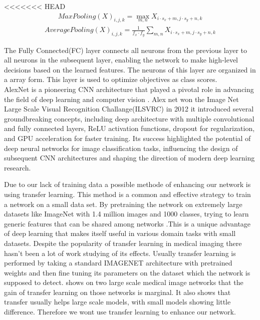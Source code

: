 \documentclass[
a4paper, 
12pt,
grayscalebody, %
abstract=on,
twoside, BCOR10mm, 12pt, DIV13,headinclude, footexclude, final, abstracton, openright
]{ibireprt}
\numberwithin{equation}{chapter}
\numberwithin{table}{chapter}
\numberwithin{figure}{chapter}
\numberwithin{algorithm}{chapter}
\numberwithin{example}{chapter}
\numberwithin{example}{chapter}
\begin{document}
<<<<<<< HEAD
\begin{align}
	MaxPooling(X)_{i,j,k} = \max_{m,n}X_{i\cdot s_x + m, j \cdot s_y+n,k}
\end{align}
\begin{align}
	AveragePooling(X)_{i,j,k} =\frac{1}{f_x\cdot f_y}\sum_{m,n} X_{i\cdot s_x + m, j \cdot s_y+n,k}
\end{align}

The Fully Connected(FC) layer connects all neurons from the previous layer to all neurons in the subsequent layer, enabling the network to make high-level decisions based on the learned features. The neurons of this layer are organized in a array form. This layer is used to optimize objectives as class scores.\\%


AlexNet is a pioneering CNN architecture that played a pivotal role in advancing the field of deep learning and computer vision \cite{Alzubaidi2021}. Alex net won the Image Net Large Scale Visual Recognition Challange(ILSVRC) in 2012 it introduced several groundbreaking concepts, including deep architecture  with multiple convolutional and fully connected layers, ReLU activation functions, dropout for regularization, and GPU acceleration for faster training. Its success highlighted the potential of deep neural networks for image classification tasks, influencing the design of subsequent CNN architectures and shaping the direction of modern deep learning research.

Due to our lack of training data a possible methode of enhancing our network is using transfer learning. This method is a common and effective strategy to train a network on a small data set. By pretraining the network on extremely large datasets like ImageNet with 1.4 million images and 1000 classes, trying to learn generic features that can be shared among networks \cite{Yamashita2018}.This is a unique advantage of deep learning that makes itself useful in various domain tasks with small datasets. Despite the popularity of transfer learning in medical imaging there hasn't been a lot of work studying of its effects. Usually transfer learning is performed by taking a standard IMAGENET architecture with pretrained weights and then fine tuning its parameters on the dataset which the network is supposed to detect.
\cite{NEURIPS2019_eb1e7832} shows on two large scale medical image networks that the gain of transfer learning on those networks is marginal. It also shows that transfer usually helps large scale models, with small models showing little difference. Therefore we wont use transfer learning to enhance our network.
\end{document}
